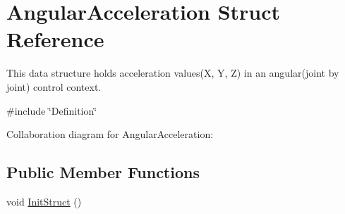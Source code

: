 \hypertarget{struct_angular_acceleration}{}\section{Angular\+Acceleration Struct Reference}
\label{struct_angular_acceleration}


This data structure holds acceleration values(\+X, Y, Z) in an angular(joint by joint) control context.  




{\ttfamily \#include \char`\"{}Definition\char`\"{}}



Collaboration diagram for Angular\+Acceleration\+:
\subsection*{Public Member Functions}
\begin{DoxyCompactItemize}
\item 
void \hyperlink{struct_angular_acceleration_a4afb405ec59c4f2ceac6302021eaebf8}{Init\+Struct} ()
\end{DoxyCompactItemize}

